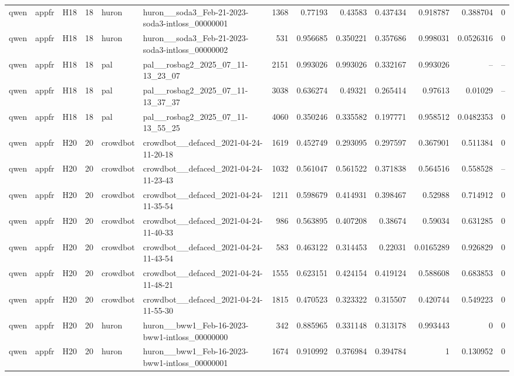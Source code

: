 \begin{longtable}{lllrllrrrrrrr}
qwen & appfr & H18 & 18 & huron & huron\_\_soda3\_Feb-21-2023-soda3-intloss\_00000001 & 1368 & 0.77193 & 0.43583 & 0.437434 & 0.918787 & 0.388704 & 0 \\
qwen & appfr & H18 & 18 & huron & huron\_\_soda3\_Feb-21-2023-soda3-intloss\_00000002 & 531 & 0.956685 & 0.350221 & 0.357686 & 0.998031 & 0.0526316 & 0 \\
qwen & appfr & H18 & 18 & pal & pal\_\_rosbag2\_2025\_07\_11-13\_23\_07 & 2151 & 0.993026 & 0.993026 & 0.332167 & 0.993026 & -- & -- \\
qwen & appfr & H18 & 18 & pal & pal\_\_rosbag2\_2025\_07\_11-13\_37\_37 & 3038 & 0.636274 & 0.49321 & 0.265414 & 0.97613 & 0.01029 & -- \\
qwen & appfr & H18 & 18 & pal & pal\_\_rosbag2\_2025\_07\_11-13\_55\_25 & 4060 & 0.350246 & 0.335582 & 0.197771 & 0.958512 & 0.0482353 & 0 \\
qwen & appfr & H20 & 20 & crowdbot & crowdbot\_\_defaced\_2021-04-24-11-20-18 & 1619 & 0.452749 & 0.293095 & 0.297597 & 0.367901 & 0.511384 & 0 \\
qwen & appfr & H20 & 20 & crowdbot & crowdbot\_\_defaced\_2021-04-24-11-23-43 & 1032 & 0.561047 & 0.561522 & 0.371838 & 0.564516 & 0.558528 & -- \\
qwen & appfr & H20 & 20 & crowdbot & crowdbot\_\_defaced\_2021-04-24-11-35-54 & 1211 & 0.598679 & 0.414931 & 0.398467 & 0.52988 & 0.714912 & 0 \\
qwen & appfr & H20 & 20 & crowdbot & crowdbot\_\_defaced\_2021-04-24-11-40-33 & 986 & 0.563895 & 0.407208 & 0.38674 & 0.59034 & 0.631285 & 0 \\
qwen & appfr & H20 & 20 & crowdbot & crowdbot\_\_defaced\_2021-04-24-11-43-54 & 583 & 0.463122 & 0.314453 & 0.22031 & 0.0165289 & 0.926829 & 0 \\
qwen & appfr & H20 & 20 & crowdbot & crowdbot\_\_defaced\_2021-04-24-11-48-21 & 1555 & 0.623151 & 0.424154 & 0.419124 & 0.588608 & 0.683853 & 0 \\
qwen & appfr & H20 & 20 & crowdbot & crowdbot\_\_defaced\_2021-04-24-11-55-30 & 1815 & 0.470523 & 0.323322 & 0.315507 & 0.420744 & 0.549223 & 0 \\
qwen & appfr & H20 & 20 & huron & huron\_\_bww1\_Feb-16-2023-bww1-intloss\_00000000 & 342 & 0.885965 & 0.331148 & 0.313178 & 0.993443 & 0 & 0 \\
qwen & appfr & H20 & 20 & huron & huron\_\_bww1\_Feb-16-2023-bww1-intloss\_00000001 & 1674 & 0.910992 & 0.376984 & 0.394784 & 1 & 0.130952 & 0 \\

\end{longtable}

